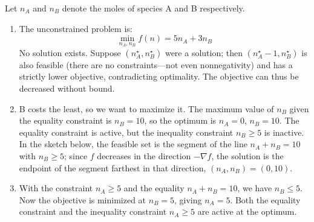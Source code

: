 \begin{solution}
    Let $n_A$ and $n_B$ denote the moles of species A and B respectively.
    
    \begin{enumerate}[label=(\alph*)]
        \item The unconstrained problem is:
        \[
            \min_{n_A, n_B} f(n) = 5n_A + 3n_B
        \]
        No solution exists. Suppose $(n_A^\star, n_B^\star)$ were a solution; then $(n_A^\star - 1, n_B^\star)$ is also feasible (there are no constraints---not even nonnegativity) and has a strictly lower objective, contradicting optimality. The objective can thus be decreased without bound.

        \item B costs the least, so we want to maximize it. The maximum value of $n_B$ given the equality constraint is $n_B = 10$, so the optimum is $n_A = 0$, $n_B = 10$. The equality constraint is active, but the inequality constraint $n_B \geq 5$ is inactive. In the sketch below, the feasible set is the segment of the line $n_A + n_B = 10$ with $n_B \geq 5$; since $f$ decreases in the direction $-\nabla f$, the solution is the endpoint of the segment farthest in that direction, $(n_A, n_B) = (0, 10)$.
        \begin{center}
        \end{center}
        
        \item With the constraint $n_A \geq 5$ and the equality $n_A + n_B = 10$, we have $n_B \leq 5$. Now the objective is minimized at $n_B = 5$, giving $n_A = 5$. Both the equality constraint and the inequality constraint $n_A \geq 5$ are active at the optimum.
    \end{enumerate}
\end{solution}

